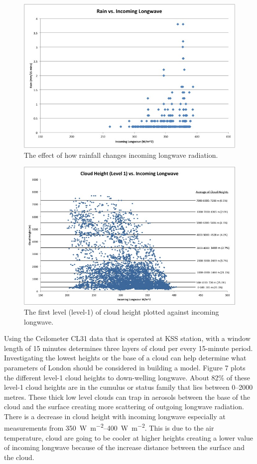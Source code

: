 \documentclass[a4paper,titlepage, twoside]{report}
\begin{document}
\begin{figure}
\includegraphics[width=\textwidth]{4.jpg}
\caption{The effect of how rainfall changes incoming longwave radiation.}
\label{fig:longwave-4}
\end{figure}

\begin{figure}
\includegraphics[width=\textwidth]{7.jpg}
\caption{The first level (level-1) of cloud height plotted against incoming longwave.}
\label{fig:longwave-7}
\end{figure}

Using the Ceilometer CL31 data that is operated at KSS station, with a window length of 15 minutes determines three layers of cloud per every 15-minute period.  Investigating the lowest heights or the base of a cloud can help determine what parameters of London should be considered in building a model.  Figure 7 plots the different level-1 cloud heights to down-welling longwave. About 82\% of these level-1 cloud heights are in the cumulus or status family that lies between 0--2000 metres.  These thick low level clouds can trap in aerosols between the base of the cloud and the surface creating more scattering of outgoing longwave radiation.  There is a decrease in cloud height with incoming longwave especially at measurements from \SIrange{350}{400}{\watt\per\meter\squared}.  This is due to the air temperature, cloud are going to be cooler at higher heights creating a lower value of incoming longwave because of the increase distance between the surface and the cloud.
\end{document}

